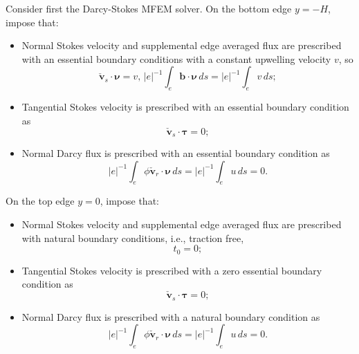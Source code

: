 \noindent Consider first the Darcy-Stokes MFEM solver. On the 
bottom edge $y=-H$, impose that:
					 \begin{itemize}
								\item Normal Stokes velocity and supplemental edge averaged flux are prescribed 
								with an essential boundary conditions with a constant upwelling velocity $v$, so
						  \begin{equation*}
									 \check{\mathbf{v}}_s \cdot \pmb{\nu} = v,\, \lvert e \rvert^{-1}\int_e \mathbf{b}\cdot \pmb{\nu}\, ds = \lvert e \rvert^{-1}\int_e v \, ds;
						  \end{equation*}
				\item Tangential Stokes velocity is prescribed with an essential boundary condition as
						  \begin{equation*}
									 \check{\mathbf{v}}_s \cdot \pmb{\tau} = 0;
						  \end{equation*}
								\item Normal Darcy flux is prescribed with an essential boundary condition as
										  \begin{equation*}
													 \lvert e \rvert^{-1} \int_e \phi\check{\mathbf{v}}_r\cdot \pmb{\nu}\, ds = \lvert e \rvert^{-1} \int_e u\, ds = 0.
										  \end{equation*}
					 \end{itemize}
On the  top edge $y=0$, impose that:
					 \begin{itemize}
								\item Normal Stokes velocity and supplemental edge averaged flux are prescribed with natural boundary conditions, i.e., traction free,
						  \begin{equation*}
						  t_0 = 0;
						  \end{equation*}
				\item Tangential Stokes velocity is prescribed with a zero essential boundary condition as
						  \begin{equation*}
									 \check{\mathbf{v}}_s \cdot \pmb{\tau} = 0;
						  \end{equation*}
								\item Normal Darcy flux is prescribed with a natural boundary condition as
										  \begin{equation*}
													 \lvert e \rvert^{-1} \int_e \phi\check{\mathbf{v}}_r\cdot \pmb{\nu}\, ds = \lvert e \rvert^{-1} \int_e u\, ds = 0.
										  \end{equation*}
					 \end{itemize}
